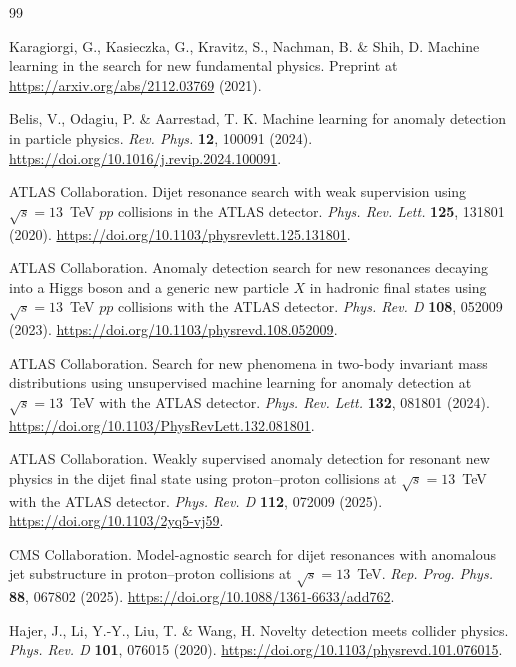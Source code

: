 \documentclass[11pt,a4paper]{article}
\begin{document}
\begingroup
\small
\begin{thebibliography}{99}

 Karagiorgi, G., Kasieczka, G., Kravitz, S., Nachman, B. \& Shih, D. Machine learning in the search for new fundamental physics. Preprint at \url{https://arxiv.org/abs/2112.03769} (2021).

 Belis, V., Odagiu, P. \& Aarrestad, T. K. Machine learning for anomaly detection in particle physics. \textit{Rev. Phys.} \textbf{12}, 100091 (2024). \url{https://doi.org/10.1016/j.revip.2024.100091}.

 ATLAS Collaboration. Dijet resonance search with weak supervision using $\sqrt{s}=13$~TeV $pp$ collisions in the ATLAS detector. \textit{Phys. Rev. Lett.} \textbf{125}, 131801 (2020). \url{https://doi.org/10.1103/physrevlett.125.131801}.

 ATLAS Collaboration. Anomaly detection search for new resonances decaying into a Higgs boson and a generic new particle $X$ in hadronic final states using $\sqrt{s}=13$~TeV $pp$ collisions with the ATLAS detector. \textit{Phys. Rev. D} \textbf{108}, 052009 (2023). \url{https://doi.org/10.1103/physrevd.108.052009}.

 ATLAS Collaboration. Search for new phenomena in two-body invariant mass distributions using unsupervised machine learning for anomaly detection at $\sqrt{s}=13$~TeV with the ATLAS detector. \textit{Phys. Rev. Lett.} \textbf{132}, 081801 (2024). \url{https://doi.org/10.1103/PhysRevLett.132.081801}.

 ATLAS Collaboration. Weakly supervised anomaly detection for resonant new physics in the dijet final state using proton--proton collisions at $\sqrt{s}=13$~TeV with the ATLAS detector. \textit{Phys. Rev. D} \textbf{112}, 072009 (2025). \url{https://doi.org/10.1103/2yq5-vj59}.

 CMS Collaboration. Model-agnostic search for dijet resonances with anomalous jet substructure in proton--proton collisions at $\sqrt{s}=13$~TeV. \textit{Rep. Prog. Phys.} \textbf{88}, 067802 (2025). \url{https://doi.org/10.1088/1361-6633/add762}.

 Hajer, J., Li, Y.-Y., Liu, T. \& Wang, H. Novelty detection meets collider physics. \textit{Phys. Rev. D} \textbf{101}, 076015 (2020). \url{https://doi.org/10.1103/physrevd.101.076015}.


\end{thebibliography}
\end{document}

